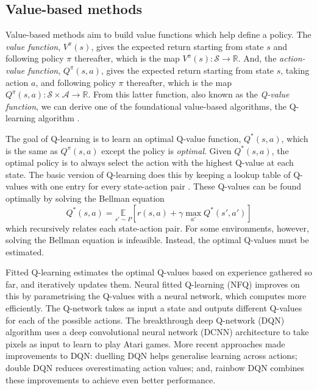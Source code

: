 \documentclass[12pt,a4paper]{article}
\begin{document}
\subsection{Value-based methods}
Value-based methods aim to build value functions which help define a policy. The \emph{value function}, $V^{\pi}(s)$, gives the expected return starting from state $s$ and following policy $\pi$ thereafter, which is the map $V^{\pi}(s): \mathcal{S} \rightarrow \mathbb{R}$. And, the \emph{action-value function}, $Q^{\pi}(s,a)$, gives the expected return starting from state $s$, taking action $a$, and following policy $\pi$ thereafter, which is the map $Q^{\pi}(s,a): \mathcal{S} \times \mathcal{A} \rightarrow \mathbb{R}$. From this latter function, also known as the \emph{Q-value function}, we can derive one of the foundational value-based algorithms, the Q-learning algorithm \cite{Watkins1992}.

The goal of Q-learning is to learn an optimal Q-value function, $Q^*(s,a)$, which is the same as $Q^{\pi}(s,a)$ except the policy is \emph{optimal}. Given $Q^*(s,a)$, the optimal policy is to always select the action with the highest Q-value at each state. The basic version of Q-learning does this by keeping a lookup table of Q-values with one entry for every state-action pair \cite{DBLP:journals/corr/abs-1811-12560}. These Q-values can be found optimally by solving the Bellman equation \cite{R-352-PR} $$Q^*(s,a) = \underset{s'\sim P}{\mathbb{E}} \left[{r(s,a) + \gamma \underset{a'}{\max} Q^*(s',a')}\right]$$ which recursively relates each state-action pair. For some environments, however, solving the Bellman equation is infeasible. Instead, the optimal Q-values must be estimated.

Fitted Q-learning \cite{10.5555/2998828.2998976} estimates the optimal Q-values based on experience gathered so far, and iteratively updates them. Neural fitted Q-learning (NFQ) \cite{10.1007/11564096_32} improves on this by parametrising the Q-values with a neural network, which computes more efficiently. The Q-network takes as input a state and outputs different Q-values for each of the possible actions. The breakthrough deep Q-network (DQN) algorithm \cite{Mnih2015} uses a deep convolutional neural network (DCNN) architecture to take pixels as input to learn to play Atari games. More recent approaches made improvements to DQN: duelling DQN \cite{DBLP:journals/corr/WangFL15} helps generalise learning across actions; double DQN \cite{DBLP:journals/corr/HasseltGS15} reduces overestimating action values; and, rainbow DQN \cite{DBLP:journals/corr/abs-1710-02298} combines these improvements to achieve even better performance.
\end{document}
